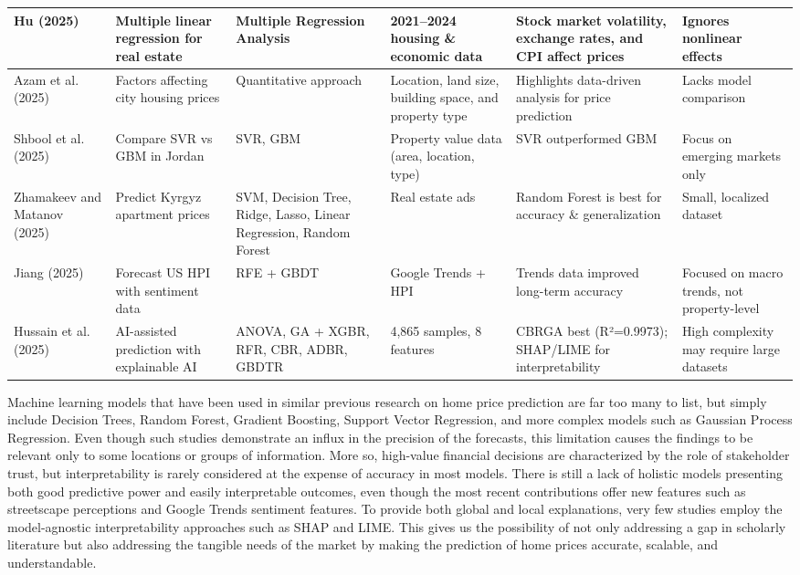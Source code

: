 \documentclass[12pt, a4paper, oneside]{book}
\begin{document}
\begin{table}[htbp]
\begin{longtable}{|p{1.5cm}|p{2.2cm}|p{2.0cm}|p{2.5cm}|p{2.8cm}|p{2.5cm}|}
\hline
Hu (2025) & Multiple linear regression for real estate & Multiple Regression Analysis & 2021--2024 housing \& economic data & Stock market volatility, exchange rates, and CPI affect prices & Ignores nonlinear effects \\
\hline
Azam et al. (2025) & Factors affecting city housing prices & Quantitative approach & Location, land size, building space, and property type & Highlights data-driven analysis for price prediction & Lacks model comparison \\
\hline
Shbool et al. (2025) & Compare SVR vs GBM in Jordan & SVR, GBM & Property value data (area, location, type) & SVR outperformed GBM & Focus on emerging markets only \\
\hline
Zhamakeev and Matanov (2025) & Predict Kyrgyz apartment prices & SVM, Decision Tree, Ridge, Lasso, Linear Regression, Random Forest & Real estate ads & Random Forest is best for accuracy \& generalization & Small, localized dataset \\
\hline
Jiang (2025) & Forecast US HPI with sentiment data & RFE + GBDT & Google Trends + HPI & Trends data improved long-term accuracy & Focused on macro trends, not property-level \\
\hline
Hussain et al. (2025) & AI-assisted prediction with explainable AI & ANOVA, GA + XGBR, RFR, CBR, ADBR, GBDTR & 4,865 samples, 8 features & CBRGA best (R²=0.9973); SHAP/LIME for interpretability & High complexity may require large datasets \\
\hline
\end{longtable}
\end{table}

Machine learning models that have been used in similar previous research on home price prediction are far too many to list, but simply include Decision Trees, Random Forest, Gradient Boosting, Support Vector Regression, and more complex models such as Gaussian Process Regression. Even though such studies demonstrate an influx in the precision of the forecasts, this limitation causes the findings to be relevant only to some locations or groups of information. More so, high-value financial decisions are characterized by the role of stakeholder trust, but interpretability is rarely considered at the expense of accuracy in most models. There is still a lack of holistic models presenting both good predictive power and easily interpretable outcomes, even though the most recent contributions offer new features such as streetscape perceptions and Google Trends sentiment features. To provide both global and local explanations, very few studies employ the model-agnostic interpretability approaches such as SHAP and LIME. This gives us the possibility of not only addressing a gap in scholarly literature but also addressing the tangible needs of the market by making the prediction of home prices accurate, scalable, and understandable.
\end{document}
